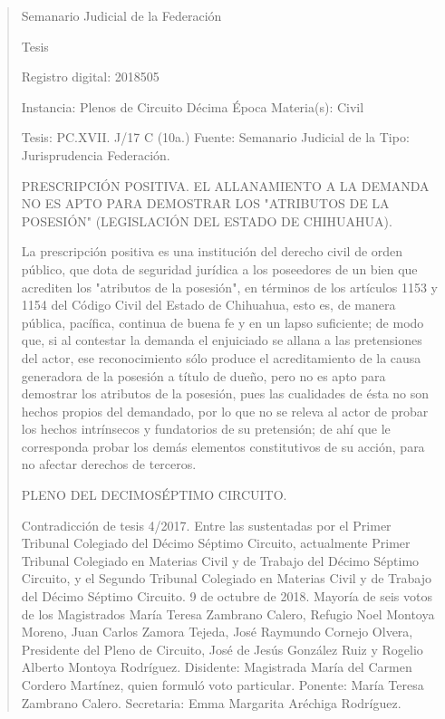 \documentclass[11pt,a4paper]{article}
\begin{document}
\begin{quote}
                                                   Semanario Judicial de la Federación

                                               Tesis

 Registro digital: 2018505

 Instancia: Plenos de Circuito     Décima Época                         Materia(s): Civil

 Tesis: PC.XVII. J/17 C (10a.)     Fuente: Semanario Judicial de la     Tipo: Jurisprudencia
                                   Federación.


PRESCRIPCIÓN POSITIVA. EL ALLANAMIENTO A LA DEMANDA NO ES APTO PARA
DEMOSTRAR LOS "ATRIBUTOS DE LA POSESIÓN" (LEGISLACIÓN DEL ESTADO DE
CHIHUAHUA).


La prescripción positiva es una institución del derecho civil de orden público, que dota de seguridad
jurídica a los poseedores de un bien que acrediten los "atributos de la posesión", en términos de los
artículos 1153 y 1154 del Código Civil del Estado de Chihuahua, esto es, de manera pública,
pacífica, continua de buena fe y en un lapso suficiente; de modo que, si al contestar la demanda el
enjuiciado se allana a las pretensiones del actor, ese reconocimiento sólo produce el acreditamiento
de la causa generadora de la posesión a título de dueño, pero no es apto para demostrar los
atributos de la posesión, pues las cualidades de ésta no son hechos propios del demandado, por lo
que no se releva al actor de probar los hechos intrínsecos y fundatorios de su pretensión; de ahí
que le corresponda probar los demás elementos constitutivos de su acción, para no afectar
derechos de terceros.

PLENO DEL DECIMOSÉPTIMO CIRCUITO.


Contradicción de tesis 4/2017. Entre las sustentadas por el Primer Tribunal Colegiado del Décimo
Séptimo Circuito, actualmente Primer Tribunal Colegiado en Materias Civil y de Trabajo del Décimo
Séptimo Circuito, y el Segundo Tribunal Colegiado en Materias Civil y de Trabajo del Décimo
Séptimo Circuito. 9 de octubre de 2018. Mayoría de seis votos de los Magistrados María Teresa
Zambrano Calero, Refugio Noel Montoya Moreno, Juan Carlos Zamora Tejeda, José Raymundo
Cornejo Olvera, Presidente del Pleno de Circuito, José de Jesús González Ruiz y Rogelio Alberto
Montoya Rodríguez. Disidente: Magistrada María del Carmen Cordero Martínez, quien formuló voto
particular. Ponente: María Teresa Zambrano Calero. Secretaria: Emma Margarita Aréchiga
Rodríguez.


\end{quote}
\end{document}
